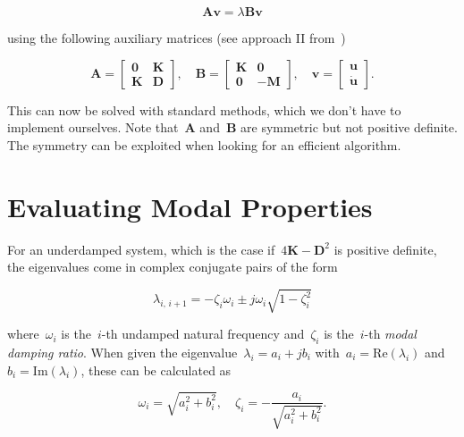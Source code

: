 \begin{equation}
\boldsymbol{A}\boldsymbol{v} = \lambda\boldsymbol{B}\boldsymbol{v}
\end{equation}

using the following auxiliary matrices (see approach II from~\cite{bib:dw07})

\begin{equation}
\boldsymbol{A}
=
\begin{bmatrix}
\boldsymbol{0} & \boldsymbol{K} \\
\boldsymbol{K} & \boldsymbol{D}
\end{bmatrix},
\quad
\boldsymbol{B}
=
\begin{bmatrix}
\boldsymbol{K} & \boldsymbol{0} \\
\boldsymbol{0} & \boldsymbol{-M}
\end{bmatrix},
\quad
\boldsymbol{v}
=
\begin{bmatrix}
\boldsymbol{u} \\
\dot{\boldsymbol{u}}
\end{bmatrix}.
\end{equation}

This can now be solved with standard methods, which we don't have to implement ourselves.
Note that~$\boldsymbol{A}$ and~$\boldsymbol{B}$ are symmetric but not positive definite. The symmetry can be exploited when looking for an efficient algorithm.

\section{Evaluating Modal Properties}

For an underdamped system, which is the case if~$4\boldsymbol{K} - \boldsymbol{D}^2$ is positive definite, the eigenvalues come in complex conjugate pairs of the form~\cite{bib:li95}

\begin{equation}
\lambda_{i,\,i+1} = -\zeta_{i}\omega_{i} \pm j\omega_{i}\sqrt{1 - \zeta_{i}^2}
\end{equation}

where~$\omega_{i}$ is the~$i$-th undamped natural frequency and~$\zeta_{i}$ is the~$i$-th \textit{modal damping ratio}.
When given the eigenvalue~$\lambda_{i} = a_{i} + jb_{i}$ with~$a_{i} = \mathrm{Re}(\lambda_i)$ and~$b_{i} = \mathrm{Im}(\lambda_i)$, these can be calculated as

\begin{equation}
\omega_{i} = \sqrt{a_{i}^2 + b_{i}^2}, \quad \zeta_{i} = -\frac{a_{i}}{\sqrt{a_{i}^2 + b_{i}^2}}.
\end{equation}